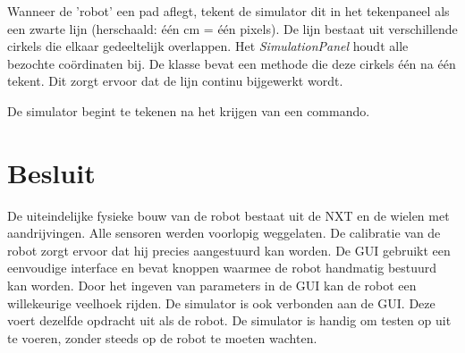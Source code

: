\documentclass[tt1]{penoverslag}
\begin{document}
Wanneer de 'robot' een pad aflegt, tekent de simulator dit in het tekenpaneel als een zwarte lijn (herschaald: \'e\'en cm = \'e\'en pixels). De lijn  bestaat uit verschillende cirkels die elkaar gedeeltelijk overlappen. Het \textit{SimulationPanel} houdt alle bezochte co\"ordinaten bij. De klasse bevat een methode die deze cirkels \'e\'en na \'e\'en tekent. Dit zorgt ervoor dat de lijn continu bijgewerkt wordt.

De simulator begint te tekenen na het krijgen van een commando.



\section{Besluit}
De uiteindelijke fysieke bouw van de robot bestaat uit de NXT en de wielen met aandrijvingen. Alle sensoren werden voorlopig weggelaten. 
De calibratie van de robot zorgt ervoor dat hij precies aangestuurd kan worden.
De GUI gebruikt een eenvoudige interface en bevat knoppen waarmee de robot handmatig bestuurd kan worden. Door het ingeven van parameters in de GUI kan de robot een willekeurige veelhoek rijden. De simulator is ook verbonden aan de GUI. Deze voert dezelfde opdracht uit als de robot. De simulator is handig om testen op uit te voeren, zonder steeds op de robot te moeten wachten.
\end{document}
